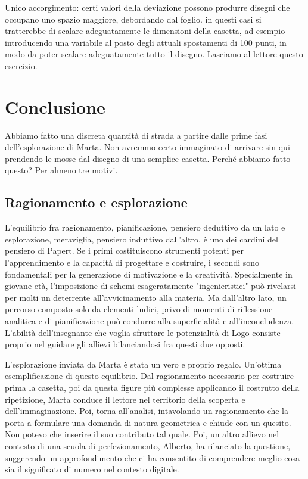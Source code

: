 Unico accorgimento: certi valori della deviazione possono produrre disegni che occupano uno spazio maggiore, debordando dal foglio. in questi casi si tratterebbe di scalare adeguatamente le dimensioni della casetta, ad esempio introducendo una variabile al posto degli attuali spostamenti di 100 punti, in modo da poter scalare adeguatamente tutto il disegno. Lasciamo al lettore questo esercizio.

\section{Conclusione}

Abbiamo fatto una discreta quantità di strada a partire dalle prime fasi
dell'esplorazione di Marta. Non avremmo certo immaginato di arrivare sin qui
prendendo le mosse dal disegno di una semplice casetta. Perché abbiamo fatto
questo? Per almeno tre motivi.


\subsection{Ragionamento e esplorazione}

L'equilibrio fra ragionamento, pianificazione, pensiero deduttivo da un lato e
esplorazione, meraviglia, pensiero induttivo dall'altro, è uno dei cardini del
pensiero di Papert. Se i primi costituiscono strumenti potenti per
l'apprendimento e la capacità di progettare e costruire, i secondi sono
fondamentali per la generazione di motivazione e la creatività. Specialmente in
giovane età, l'imposizione di schemi esageratamente "ingenieristici" può
rivelarsi per molti un deterrente all'avvicinamento alla materia. Ma dall'altro
lato, un percorso composto solo da elementi ludici, privo di momenti di
riflessione analitica e di pianificazione può condurre alla superficialità e
all'inconcludenza. L'abilità dell'insegnante che voglia sfruttare le
potenzialità di Logo consiste proprio nel guidare gli allievi bilanciandosi fra
questi due opposti. 

L'esplorazione inviata da Marta è stata un vero e proprio regalo. Un'ottima
esemplificazione di questo equilibrio. Dal ragionamento necessario per
costruire prima la casetta, poi da questa figure più complesse applicando il
costrutto della ripetizione, Marta conduce il lettore nel territorio della
scoperta e dell'immaginazione. Poi, torna all'analisi, intavolando un
ragionamento che la porta a formulare una domanda di natura geometrica e chiude
con un quesito. Non potevo che inserire il suo contributo tal quale. Poi, un altro
allievo nel contesto di una scuola di perfezionamento, Alberto, ha rilanciato
la questione, suggerendo un approfondimento che ci ha consentito di comprendere
meglio cosa sia il significato di numero nel contesto digitale.

